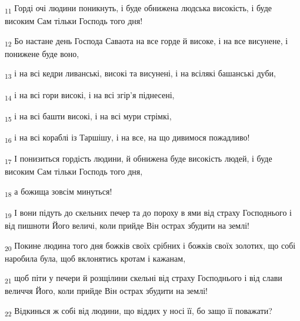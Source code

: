 \begin{tcolorbox}
\textsubscript{11} Горді очі людини поникнуть, і буде обнижена людська високість, і буде високим Сам тільки Господь того дня!
\end{tcolorbox}
\begin{tcolorbox}
\textsubscript{12} Бо настане день Господа Саваота на все горде й високе, і на все висунене, і понижене буде воно,
\end{tcolorbox}
\begin{tcolorbox}
\textsubscript{13} і на всі кедри ливанські, високі та висунені, і на всілякі башанські дуби,
\end{tcolorbox}
\begin{tcolorbox}
\textsubscript{14} і на всі гори високі, і на всі згір'я піднесені,
\end{tcolorbox}
\begin{tcolorbox}
\textsubscript{15} і на всі башти високі, і на всі мури стрімкі,
\end{tcolorbox}
\begin{tcolorbox}
\textsubscript{16} і на всі кораблі із Таршішу, і на все, на що дивимося пожадливо!
\end{tcolorbox}
\begin{tcolorbox}
\textsubscript{17} І понизиться гордість людини, й обнижена буде високість людей, і буде високим Сам тільки Господь того дня,
\end{tcolorbox}
\begin{tcolorbox}
\textsubscript{18} а божища зовсім минуться!
\end{tcolorbox}
\begin{tcolorbox}
\textsubscript{19} І вони підуть до скельних печер та до пороху в ями від страху Господнього і від пишноти Його величі, коли прийде Він острах збудити на землі!
\end{tcolorbox}
\begin{tcolorbox}
\textsubscript{20} Покине людина того дня божків своїх срібних і божків своїх золотих, що собі наробила була, щоб вклонятись кротам і кажанам,
\end{tcolorbox}
\begin{tcolorbox}
\textsubscript{21} щоб піти у печери й розщілини скельні від страху Господнього і від слави величчя Його, коли прийде Він острах збудити на землі!
\end{tcolorbox}
\begin{tcolorbox}
\textsubscript{22} Відкинься ж собі від людини, що віддих у носі її, бо защо її поважати?
\end{tcolorbox}
